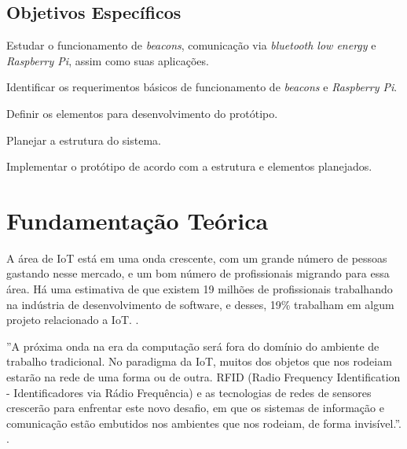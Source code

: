 \documentclass[
	12pt,				%
	openright,			%
	oneside,			%
	a4paper,			%
	chapter=TITLE,		%
	english,			%
	brazil				%
	]{abntex2}
\begin{document}
{%

\section{Objetivos Específicos}

\begin{alineas}
	\item Estudar o funcionamento de \textit{beacons}, comunicação via \textit{bluetooth low energy} e \textit{Raspberry Pi}, assim como suas aplicações.
	\item Identificar os requerimentos básicos de funcionamento de \textit{beacons} e \textit{Raspberry Pi}.
	\item Definir os elementos para desenvolvimento do protótipo.
	\item Planejar a estrutura do sistema.
	\item Implementar o protótipo de acordo com a estrutura e elementos planejados.
\end{alineas}



\chapter{Fundamentação Teórica}

A área de IoT está em uma onda crescente, com um grande número de pessoas gastando nesse mercado, e um bom número de profissionais migrando para essa área. Há uma estimativa de que existem 19 milhões de profissionais trabalhando na indústria de desenvolvimento de software, e desses, 19\% trabalham em algum projeto relacionado a IoT. \cite{cw-iot}.

\begin{citacao}
''A próxima onda na era da computação será fora do domínio do ambiente de trabalho tradicional. No paradigma da IoT, muitos dos objetos que nos rodeiam estarão na rede de uma forma ou de outra. RFID (Radio Frequency Identification - Identificadores via Rádio Frequência) e as tecnologias de redes de sensores crescerão para enfrentar este novo desafio, em que os sistemas de informação e comunicação estão embutidos nos ambientes que nos rodeiam, de forma invisível.''. \cite{iot-article}. 
\end{citacao}

}
\end{document}
